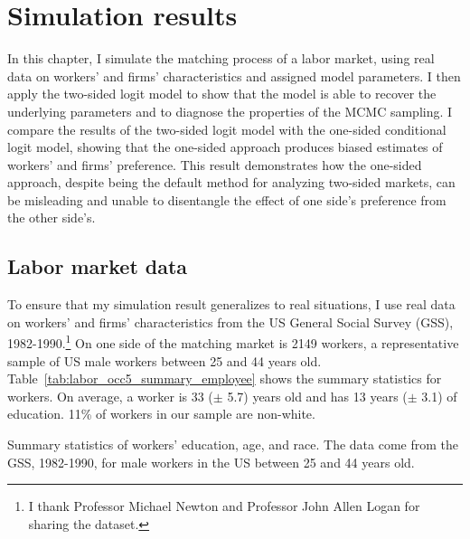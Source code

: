 \chapter{Simulation results}
\label{chap:simulation}

In this chapter, I simulate the matching process of a labor market, using real
data on
workers' and firms' characteristics and assigned model parameters. I then apply
the two-sided logit model to show that the model is able to recover the
underlying parameters and to diagnose the properties of the MCMC sampling. I
compare the results of the two-sided logit model with the one-sided conditional
logit model, showing that the one-sided approach produces biased estimates of
workers' and firms' preference. This result demonstrates how the one-sided
approach, despite being the default method for analyzing two-sided markets, can
be misleading and unable to disentangle the effect of one side's preference from
the other side's.

\section{Labor market data}

To ensure that my simulation result generalizes to real situations, I use real
data on workers' and firms' characteristics from the US General Social Survey
(GSS), 1982-1990.\footnote{I thank Professor Michael Newton and Professor John
  Allen Logan for sharing the dataset.} On one side of the matching market is 2149 workers, a representative sample
of US male workers between 25 and 44 years old.
Table~\ref{tab:labor_occ5_summary_employee} shows the summary statistics for
workers. On average, a worker is 33 ($\pm$ 5.7)
years old and has 13 years ($\pm$ 3.1) of education. 11\% of workers in our sample are
non-white.

\begin{table}[!ht]
  \centering
  \caption{Summary statistics of workers' education, age, and race. The data
    come from the GSS, 1982-1990, for male workers in the US between 25 and 44
    years old.}
  \label{tab:labor_occ5_summary_employee}

\end{table}

